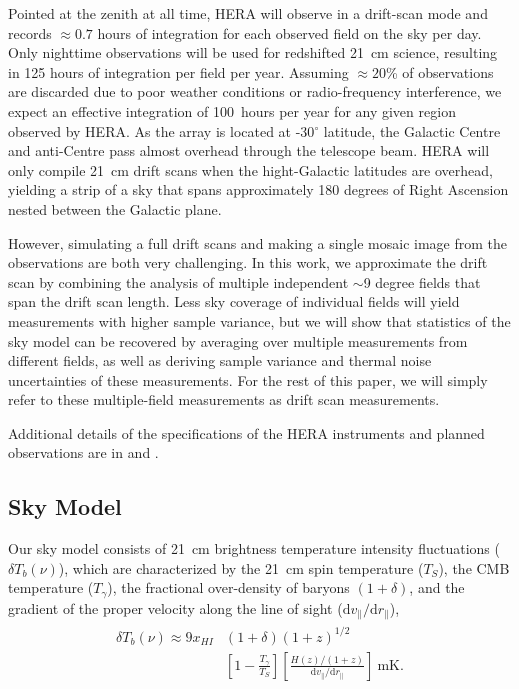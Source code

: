 \documentclass[fleqn,usenatbib]{mnras}
\begin{document}
Pointed at the zenith at all time, HERA will observe in a drift-scan mode and records $\approx0.7$ hours of integration for each observed field on the sky per day. Only nighttime observations will be used for redshifted 21~cm science, resulting in 125 hours of integration per field per year. Assuming $\approx20$\% of observations are discarded due to poor weather conditions or radio-frequency interference, we expect an effective integration of 100~hours per year for any given region observed by HERA. As the array is located at -30$^{\circ}$ latitude, the Galactic Centre and anti-Centre pass almost overhead through the telescope beam. HERA will only compile 21~cm drift scans when the hight-Galactic latitudes are overhead, yielding a strip of a sky that spans approximately 180 degrees of Right Ascension nested between the Galactic plane.

However, simulating a full drift scans and making a single mosaic image from the observations are both very challenging. In this work, we approximate the drift scan by combining the analysis of multiple independent $\sim$9 degree fields that span the drift scan length. Less sky coverage of individual fields will yield measurements with higher sample variance, but we will show that statistics of the sky model can be recovered by averaging over multiple measurements from different fields, as well as deriving sample variance and thermal noise uncertainties of these measurements. For the rest of this paper, we will simply refer to these multiple-field measurements as drift scan measurements.

Additional details of the specifications of the HERA instruments and planned observations are in \citet{2016ApJ...826..181D} and \citet{2017PASP..129d5001D}.

\subsection{Sky Model}
\label{sec:model}
Our sky model consists of 21~cm brightness temperature intensity fluctuations ($\delta T_b(\nu)$), which are characterized by the 21~cm spin temperature ($T_S$),  the CMB temperature ($T_{\gamma}$), the fractional over-density of baryons $(1 +  \delta)$, and the gradient of the proper velocity along the line of sight ($\mathrm{d}v_{\parallel}/\mathrm{d}r_{\parallel}$),
\begin{gather}
    \begin{split}
        \delta T_b(\nu) \approx 9 x_{HI}&(1+\delta)(1+z)^{1/2} \\
        &\left[1 - \frac{T_{\gamma}}{T_S}\right]
         \left[\frac{H(z)/(1+z)}{\mathrm{d}v_{\parallel}/\mathrm{d}r_{\parallel}}
          \right]\ \mathrm{mK}.
    \end{split}
\end{gather}
\end{document}
